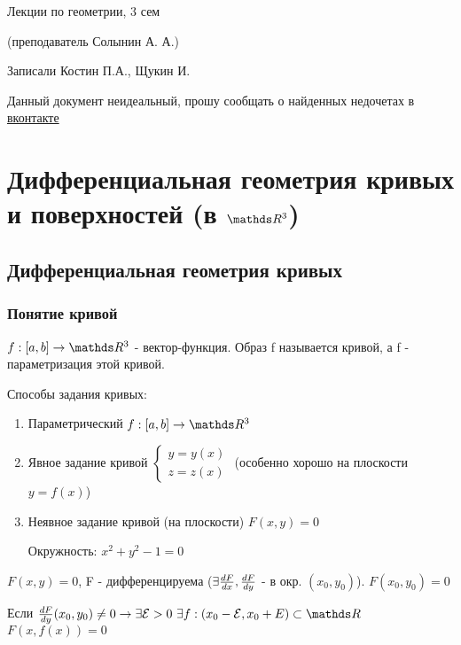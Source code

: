 \documentclass[12pt, fleqn]{article}
\begin{document}
\begin{center}
  \huge Лекции по геометрии, 3 сем
  
  \Large (преподаватель Солынин А. А.)
  
  \large Записали Костин П.А., Щукин И.
\end{center}

Данный документ неидеальный, прошу сообщать о найденных недочетах в \href{https://vk.com/drab_existence_a}{вконтакте}
\tableofcontents
\newpage

\section{Дифференциальная геометрия кривых и поверхностей (в $\R^3$)}
\subsection{Дифференциальная геометрия кривых}
\subsubsection{Понятие кривой}

\begin{definition}
    $f:[a,b] \rightarrow \R^3$ - вектор-функция. Образ f называется кривой, а f - параметризация этой кривой.
\end{definition}

Способы задания кривых:
\begin{enumerate}
    \item Параметрический $f:[a,b] \rightarrow \R^3$
    \item Явное задание кривой $\begin{cases} y=y(x)\\ z=z(x)
    \end{cases}$ (особенно хорошо на плоскости $y=f(x)$)
    \item Неявное задание кривой (на плоскости) $F(x,y)=0$
    \begin{example}
        Окружность: $x^2+y^2-1=0$
    \end{example}
\end{enumerate}

\begin{theorem}
$F(x,y)=0$, F - дифференцируема ($\exists \frac{dF}{dx}, \frac{dF}{dy}$ - в окр. $(x_0,y_0)$). $F(x_0,y_0)=0$

Если $\frac{dF}{dy}(x_0,y_0) \neq 0 \ra \e \E>0\ \e f: (x_0-\E,x_0+E) \subset \R$ $F(x, f(x))=0$
\end{theorem}
\end{document}
